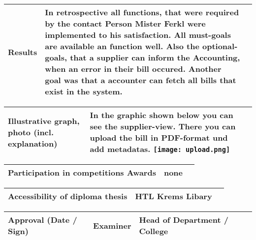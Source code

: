 \vspace{0.5cm}

\begin{tabular}{|p{53mm}|p{110mm}|@{}m{0cm}@{}}
\hline
Results & In retrospective all functions, that were required by the contact Person Mister Ferkl were implemented to his satisfaction. All must-goals are available an function well. Also the optional-goals, that a supplier can inform the Accounting, when an error in their bill occured. Another goal was that a accounter can fetch all bills that exist in the system. & \\
\hline
\end{tabular}
\newpage

\begin{tabular}{|p{53mm}|p{110mm}|@{}m{0cm}@{}}
\hline
Illustrative graph, photo (incl. explanation) & In the graphic shown below you can see the supplier-view. There you can upload the bill in PDF-format und add metadatas. \texttt{[image: upload.png]} & \\
\hline
\end{tabular}

\vspace{0.5cm}

\begin{tabular}{|p{53mm}|p{110mm}|@{}m{0cm}@{}}
\hline
Participation in \newline competitions \newline Awards & none & \\ 
\hline
\end{tabular}

\vspace{0.5cm}

\begin{tabular}{|p{53mm}|p{110mm}|@{}m{0cm}@{}}
\hline
Accessibility of \newline diploma thesis & HTL Krems Libary & \\
\hline
\end{tabular}

\vspace{0.5cm}

\begin{tabular}{|p{5.3cm}|p{5.28cm}|p{5.29cm}|@{}m{0cm}@{}}
\hline
\vspace{-0.6cm}Approval \newline (Date / Sign) & \vspace{-1.1cm} Examiner & \vspace{-1.1cm} Head of Department / \newline College & \\ [1.9cm]
\hline
\end{tabular}